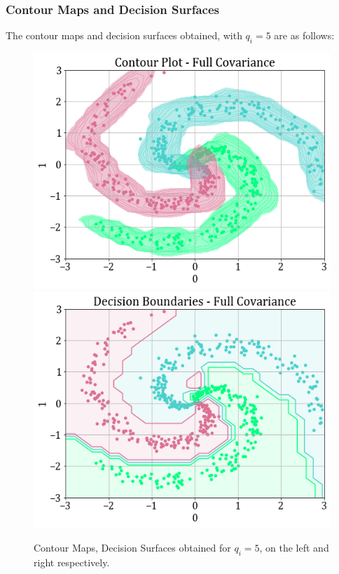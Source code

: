 \documentclass[11pt,a4paper]{article}
\begin{document}
\subsubsection{Contour Maps and Decision Surfaces}
The contour maps and decision surfaces obtained, with $q_i=5$ are as follows:
\begin{figure}[H]
    \hspace{-1em}
    \includegraphics[scale=0.45]{images/1b_full_contours.png}
    \includegraphics[scale=0.45]{images/1b_full_decision_surfaces.png}
    \caption{Contour Maps, Decision Surfaces obtained for $q_i=5$, on the left and right respectively.}
\end{figure}
\end{document}
